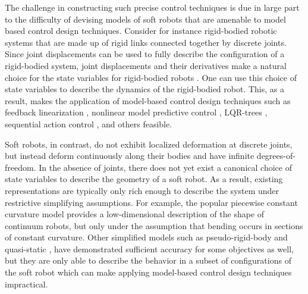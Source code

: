 The challenge in constructing such precise control techniques is due in large part to the difficulty of devising models of soft robots that are amenable to model based control design techniques.
Consider for instance rigid-bodied robotic systems that are made up of rigid links connected together by discrete joints.
Since joint displacements can be used to fully describe the configuration of a rigid-bodied system, joint displacements and their derivatives make a natural choice for the state variables for rigid-bodied robots \cite{spong2008robot}.
One can use this choice of state variables to describe the dynamics of the rigid-bodied robot.
This, as a result, makes the application of model-based control design techniques such as feedback linearization \cite{spong2008robot}, nonlinear model predictive control \cite{allgower2012nonlinear}, LQR-trees \cite{tedrake2010lqr}, sequential action control \cite{ansari2016sequential}, and others feasible.

Soft robots, in contrast, do not exhibit localized deformation at discrete joints, but instead deform continuously along their bodies and have infinite degrees-of-freedom.
In the absence of joints, there does not yet exist a canonical choice of state variables to describe the geometry of a soft robot.
As a result, existing representations are typically only rich enough to describe the system under restrictive simplifying assumptions.
For example, the popular piecewise constant curvature model \cite{webster2010design} provides a low-dimensional description of the shape of continuum robots, but only under the assumption that bending occurs in sections of constant curvature.
Other simplified models such as pseudo-rigid-body \cite{howell1996evaluation} and quasi-static \cite{bruder2018iros, thuruthel2018model, gravagne2003large, trivedi2008geometrically}, have demonstrated sufficient accuracy for some objectives as well,
but they are only able to describe the behavior in a subset of configurations of the soft robot which can make applying model-based control design techniques impractical. 

